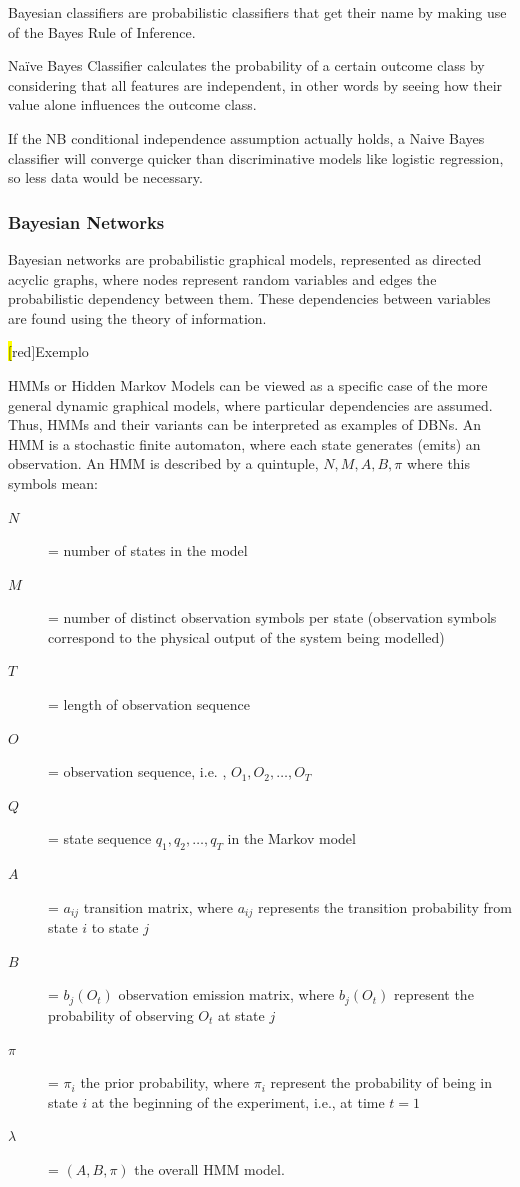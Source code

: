 Bayesian classifiers are probabilistic classifiers that get their name by making use of the Bayes Rule of Inference. 

Naïve Bayes Classifier calculates the probability of a certain outcome class by considering that all features are independent,
 in other words by seeing how their value alone influences the outcome class. 

If the NB conditional independence assumption actually holds, a Naive Bayes classifier will converge quicker than
 discriminative models like logistic regression, so less data would be necessary.

\subsubsection{Bayesian Networks}
\label{subsubsection:bn}	

Bayesian networks are probabilistic graphical models, represented as directed acyclic graphs, where nodes represent random 
variables and edges the probabilistic dependency between them. These dependencies between variables are found using the theory of information.

\hl[red]{Exemplo}

HMMs or Hidden Markov Models can be viewed as a specific case of the more general dynamic graphical models, where particular dependencies are assumed. Thus, HMMs and their variants can be interpreted as examples of DBNs.
An HMM is a stochastic finite automaton, where each state generates (emits) an observation. An HMM is described by a quintuple, ${N , M , A , B , \pi}$ where this symbols mean:

\begin{description}
	\item[$N$] = number of states in the model
	\item[$M$] = number of distinct observation symbols per state (observation symbols correspond to the physical output of the system being modelled)
	\item[$T$] = length of observation sequence
	\item[$O$] = observation sequence, i.e. , $O_1,O_2,…,O_T$
	\item[$Q$]  = state sequence $q_1,q_2,…,q_T$ in the Markov model
	\item[$A$] = ${a_{ij}}$ transition matrix, where $a_{ij}$ represents the transition probability from state $i$ to state $j$
	\item[$B$] = ${b_j (O_t)}$ observation emission matrix, where $b_j (O_t)$ represent the probability of observing $O_t$ at state $j$
	\item[$\pi$] = ${\pi_i}$ the prior probability, where $\pi_i$ represent the probability of being in state $i$ at the beginning of the
	experiment, i.e., at time $t=1$
	\item[$\lambda$] = $(A,B,\pi)$ the overall HMM model.
\end{description}

